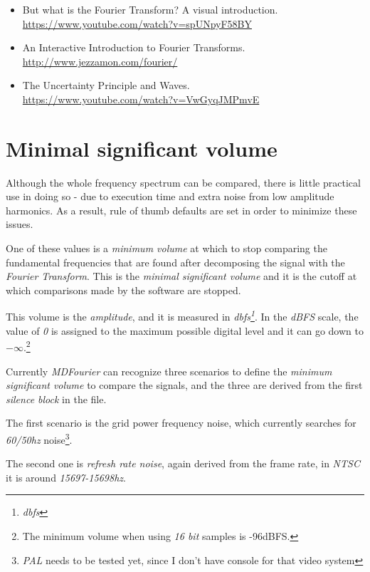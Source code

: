 \documentclass[10pt,a4paper]{report}
\newcommand{\define}[1] {
	\textit{\acrshort{#1}\footnote{\textit{\acrlong{#1}}}}}
\begin{document}
\begin{itemize}
	\item But what is the Fourier Transform? A visual introduction.\\ \url{https://www.youtube.com/watch?v=spUNpyF58BY}
	\item An Interactive Introduction to Fourier Transforms.\\ \url{http://www.jezzamon.com/fourier/}
	\item The Uncertainty Principle and Waves.\\
	\url{https://www.youtube.com/watch?v=VwGyqJMPmvE}
\end{itemize}

\section{Minimal significant volume}
\label{MinSigVolume}

Although the whole frequency spectrum can be compared, there is little practical use in doing so -  due to execution time and extra noise from low amplitude harmonics. As a result, rule of thumb defaults are set in order to minimize these issues.

One of these values is a \textit{minimum volume} at which to stop comparing the fundamental frequencies that are found after decomposing the signal with the \textit{Fourier Transform}. This is the \textit{minimal significant volume} and it is the cutoff at which comparisons made by the software are stopped.

This volume is the \textit{amplitude}, and it is measured in \define{dbfs}. In the \textit{dBFS} scale, the value of \textit{0} is assigned to the maximum possible digital level and it can go down to $-\infty$.\footnote{The minimum volume when using \textit{16 bit} samples is -96dBFS.}

Currently \textit{MDFourier} can recognize three scenarios to define the \textit{minimum significant volume} to compare the signals, and the three are derived from the first \textit{silence block} in the file.

The first scenario is the grid power frequency noise, which currently searches for \textit{60/50hz} noise\footnote{\textit{PAL} needs to be tested yet, since I don't have console for that video system}. 

The second one is \textit{refresh rate noise}, again derived from the frame rate, in \textit{NTSC} it is around \textit{15697-15698hz}. 
\end{document}
